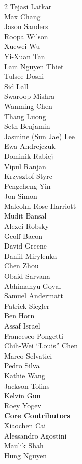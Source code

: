 \begin{multicols}{2}
Tejasi Latkar \\
Max Chang \\
Jason Sanders \\
Roopa Wilson \\
Xuewei Wu \\
Yi-Xuan Tan \\
Lam Nguyen Thiet \\
Tulsee Doshi \\
Sid Lall \\
Swaroop Mishra \\
Wanming Chen \\
Thang Luong \\
Seth Benjamin \\
Jasmine (Sun Jae) Lee \\
Ewa Andrejczuk \\
Dominik Rabiej \\
Vipul Ranjan \\
Krzysztof Styrc \\
Pengcheng Yin \\
Jon Simon \\
Malcolm Rose Harriott \\
Mudit Bansal \\
Alexei Robsky \\
Geoff Bacon \\
David Greene \\
Daniil Mirylenka \\
Chen Zhou \\
Obaid Sarvana \\
Abhimanyu Goyal \\
Samuel Andermatt \\
Patrick Siegler \\
Ben Horn \\
Assaf Israel \\
Francesco Pongetti \\
Chih-Wei “Louis” Chen \\
Marco Selvatici \\
Pedro Silva \\
Kathie Wang \\
Jackson Tolins \\
Kelvin Guu \\
Roey Yogev \\
\noindent
\textbf{Core Contributors} \\
Xiaochen Cai \\
Alessandro Agostini \\
Maulik Shah \\
Hung Nguyen \\

\end{multicols}
